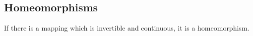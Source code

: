 
\subsection{Homeomorphisms}

If there is a mapping which is invertible and continuous, it is a homeomorphism.


